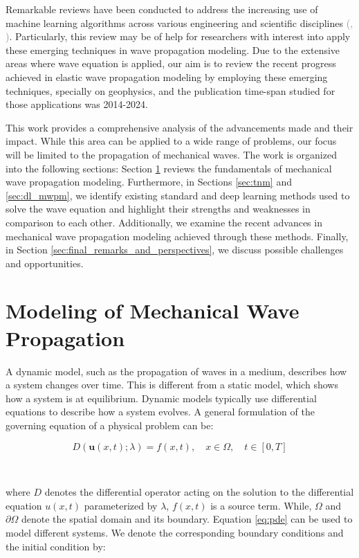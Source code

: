 \documentclass{tufte-handout}
\renewcommand{\citep}[2][]{\textcolor{gray}{(\citeauthor{#2}, \citeyear[#1]{#2})}}
\begin{document}
Remarkable reviews have been conducted to address the increasing use of machine learning algorithms across various engineering and scientific disciplines \citep{vadyala_review_2022,deng_physics-informed_2023,lino_current_2023}. Particularly, this review may be of help for researchers with interest into apply these emerging techniques in wave propagation modeling. Due to the extensive areas where wave equation is applied, our aim is to review the recent progress achieved in elastic wave propagation modeling by employing these emerging techniques, specially on geophysics, and the publication time-span studied for those applications was 2014-2024.

This work provides a comprehensive analysis of the advancements made and their impact. While this area can be applied to a wide range of problems, our focus will be limited to the propagation of mechanical waves. The work is organized into the following sections: Section \ref{sec:fordward_inverse_modeling_mechanical_waves} reviews the fundamentals of mechanical wave propagation modeling. Furthermore, in Sections \ref{sec:tnm} and \ref{sec:dl_mwpm}, we identify existing standard and deep learning methods used to solve the wave equation and highlight their strengths and weaknesses in comparison to each other. Additionally, we examine the recent advances in mechanical wave propagation modeling achieved through these methods. Finally, in Section \ref{sec:final_remarks_and_perspectives}, we discuss possible challenges and opportunities.
 
\section{Modeling of Mechanical Wave Propagation}\label{sec:fordward_inverse_modeling_mechanical_waves}
 
A dynamic model, such as the propagation of waves in a medium, describes how a system changes over time. This is different from a static model, which shows how a system is at equilibrium. Dynamic models typically use differential equations to describe how a system evolves. A general formulation of the governing equation of a physical problem can be:

\begin{equation}
D(\boldsymbol{u}(x,t); \lambda) = f(x,t), \quad x \in \Omega, \quad t \in [0, T]\label{eq:pde}
\end{equation}

\

where $D$ denotes the differential operator acting on the solution to the differential equation $u(x,t)$ parameterized by $\lambda$, $f(x, t)$ is a source term. While, $\Omega$ and $\partial\Omega$ denote the spatial domain and its boundary. Equation \ref{eq:pde} can be used to model different systems. We denote the corresponding boundary conditions and the initial condition by:
\end{document}
